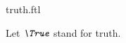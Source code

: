 \documentclass{stex}
\begin{document}
\begin{smodule}{truth.ftl}


\begin{fakeforthel}
  \begin{convention}
    Let $\emph{\True}$ stand for truth.
  \end{convention}
\end{fakeforthel}

\end{smodule}
\end{document}
